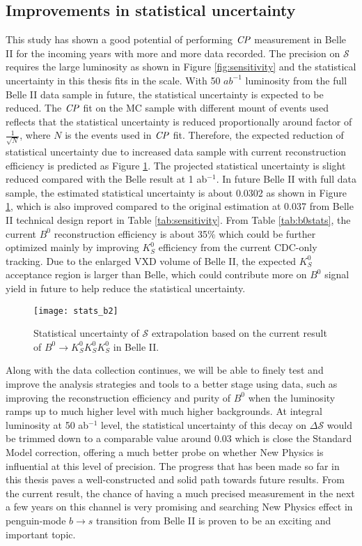 \subsection{Improvements in statistical uncertainty}
This study has shown a good potential of performing $\it{CP}$ measurement in Belle II for the incoming years with more and more data recorded. The precision on $\mathcal{S}$ requires the large luminosity as shown in Figure \ref{fig:sensitivity} and the statistical uncertainty in this thesis fits in the scale. With 50 $ab^{-1}$ luminosity from the full Belle II data sample in future, the statistical uncertainty is expected to be reduced. The $\it{CP}$ fit on the MC sample with different mount of events used reflects that the statistical uncertainty is reduced proportionally around factor of $\frac{1}{\sqrt{N}}$, where $N$ is the events used in $\it{CP}$ fit. Therefore, the expected reduction of statistical uncertainty due to increased data sample with current reconstruction efficiency is predicted as Figure \ref{fig:stats_future}. The projected statistical uncertainty is slight reduced compared with the Belle result at 1 ab$^{-1}$. In future Belle II with full data sample, the estimated statistical uncertainty is about 0.0302 as shown in Figure \ref{fig:stats_future}, which is also improved compared to the original estimation at 0.037 from Belle II technical design report in Table \ref{tab:sensitivity}. From Table \ref{tab:b0stats}, the current $B^0$ reconstruction efficiency is about 35\% which could be further optimized mainly by improving $K_S^0$ efficiency from the current CDC-only tracking. Due to the enlarged VXD volume of Belle II, the expected $K_S^0$ acceptance region is larger than Belle, which could contribute more on $B^0$ signal yield in future to help reduce the statistical uncertainty. 

\begin{figure}[htpb]
\centering
\texttt{[image: stats\_b2]}
\caption{Statistical uncertainty of $\mathcal{S}$ extrapolation based on the current result of $B^0 \to K_S^0  K_S^0  K_S^0$ in Belle II.}
\label{fig:stats_future}
\end{figure}




 Along with the data collection continues, we will be able to finely test and improve the analysis strategies and tools to a better stage using data, such as improving the reconstruction efficiency and purity of $B^0$ when the luminosity ramps up to much higher level with much higher backgrounds. At integral luminosity at 50 ab$^{-1}$ level, the statistical uncertainty of this decay on $\Delta \mathcal{S}$ would be trimmed down to a comparable value around $0.03$ which is close the Standard Model correction, offering a much better probe on whether New Physics is influential at this level of precision. The progress that has been made so far in this thesis paves a well-constructed and solid path towards future results.
 From the current result, the chance of having a much precised measurement in the next a few years on this channel is very promising and searching New Physics effect in penguin-mode $b\to s$ transition from Belle II is proven to be an exciting and important topic. 
 
 

